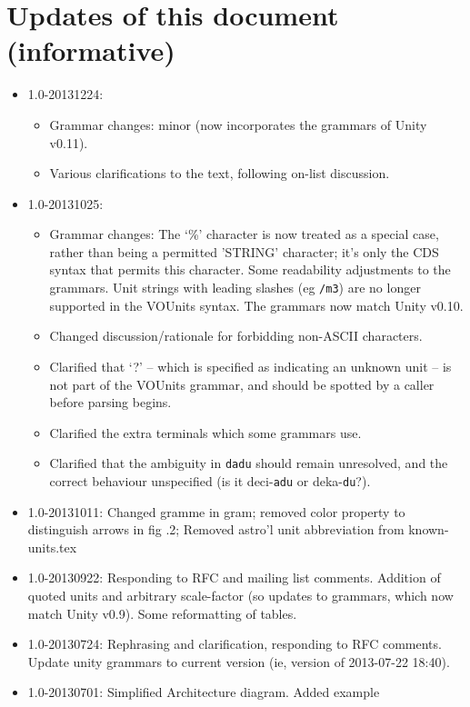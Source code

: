 \documentclass[11pt,notitlepage,onecolumn]{ivoa}
\newcommand{\unit}[1]{\texttt{\small\color{orange}#1}}
\begin{document}
\section{Updates of this document (informative)}
\begin{itemize}
\item 1.0-20131224:
\begin{itemize}
\item Grammar changes: minor (now incorporates the grammars of Unity v0.11).
\item Various clarifications to the text, following on-list discussion.
\end{itemize}
\item 1.0-20131025:
\begin{itemize}
\item Grammar changes: The `\%' character is now treated as a special
    case, rather than being a permitted 'STRING' character; it's only
    the CDS syntax that permits this character.  Some readability
    adjustments to the grammars.  Unit strings with leading slashes
    (eg \unit{/m3}) are no longer supported in the VOUnits syntax.
    The grammars now match Unity v0.10.
\item Changed discussion/rationale for forbidding non-ASCII
    characters.
\item Clarified that `?' -- which is specified as indicating an
    unknown unit -- is not part of the VOUnits grammar, and should be
    spotted by a caller before parsing begins.
\item Clarified the extra terminals which some grammars use.
\item Clarified that the ambiguity in \unit{dadu} should remain
    unresolved, and the correct behaviour unspecified (is it
    deci-\texttt{adu} or deka-\texttt{du}?).
\end{itemize}
\item 1.0-20131011: Changed gramme in gram; removed color property to distinguish arrows in fig .2;
Removed astro'l unit abbreviation from known-units.tex
\item 1.0-20130922: Responding to RFC and mailing list comments.
Addition of quoted units and arbitrary scale-factor (so updates to
grammars, which now match Unity v0.9).  Some reformatting of tables.
\item 1.0-20130724: Rephrasing and clarification, responding to RFC
comments.  Update unity grammars to current version (ie, version of 2013-07-22 18:40).
\item 1.0-20130701: Simplified Architecture diagram. Added example

\end{itemize}
\end{document}
